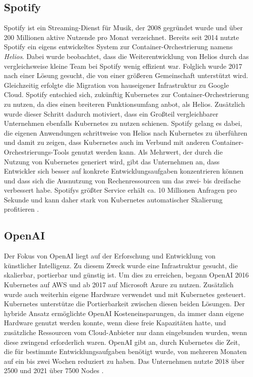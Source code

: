 \documentclass[11pt,a4paper]{article}
\begin{document}
\subsection{Spotify}
Spotify ist ein Streaming-Dienst für Musik, der 2008 gegründet wurde
und über 200 Millionen aktive Nutzende pro Monat verzeichnet.
Bereits seit 2014 nutzte Spotify ein eigens entwickeltes System zur Container-Orchestrierung
namens \emph{Helios}. Dabei wurde beobachtet, dass die Weiterentwicklung von Helios
durch das vergleichsweise kleine Team bei Spotify wenig effizient war.
Folglich wurde 2017 nach einer Lösung gesucht, die von einer größeren Gemeinschaft
unterstützt wird. Gleichzeitig erfolgte die Migration von hauseigener Infrastruktur
zu Google Cloud. Spotify entschied sich, zukünftig Kubernetes zur Container-Orchestrierung zu nutzen,
da dies einen breiteren Funktionsumfang anbot, als Helios.
Zusätzlich wurde dieser Schritt dadurch motiviert, dass ein Großteil
vergleichbarer Unternehmen ebenfalls Kubernetes zu nutzen schienen.
Spotify gelang es dabei, die eigenen Anwendungen schrittweise
von Helios nach Kubernetes zu überführen und damit zu zeigen, dass Kubernetes
auch im Verbund mit anderen Container-Orchestrierungs-Tools genutzt werden kann.
Als Mehrwert, der durch die Nutzung von Kubernetes generiert wird,
gibt das Unternehmen an, dass Entwickler sich besser auf konkrete Entwicklungsaufgaben
konzentrieren können und dass sich die Ausnutzung von Rechenressourcen
um das zwei- bis dreifache verbessert habe.
Spotifys größter Service erhält ca. 10 Millionen Anfragen pro Sekunde
und kann daher stark von Kubernetes automatischer Skalierung profitieren \cite{story_spotify}.

\subsection{OpenAI}
\label{sec:openai}
Der Fokus von OpenAI liegt auf der Erforschung und Entwicklung von künstlicher Intelligenz.
Zu diesem Zweck wurde eine Infrastruktur gesucht, die skalierbar, portierbar und günstig ist.
Um dies zu erreichen, begann \mbox{OpenAI} 2016 Kubernetes auf AWS und ab 2017 auf
Microsoft Azure zu nutzen. Zusätzlich wurde auch weiterhin eigene Hardware verwendet
und mit Kubernetes gesteuert.
Kubernetes unterstütze die Portierbarkeit zwischen diesen beiden Lösungen.
Der hybride Ansatz ermöglichte OpenAI Kosteneinsparungen,
da immer dann eigene Hardware genutzt werden konnte, wenn diese freie Kapazitäten hatte,
und zusätzliche Ressourcen vom Cloud-Anbieter nur dann eingebunden wurden,
wenn diese zwingend erforderlich waren.
OpenAI gibt an, durch Kubernetes die Zeit, die für bestimmte Entwicklungsaufgaben
benötigt wurde, von mehreren Monaten auf ein bis zwei Wochen reduziert zu haben.
Das Unternehmen nutzte 2018 über 2500 \cite{openai_scaling_2500} und 2021 über 7500 Nodes \cite{openai_scaling_7500} \cite{story_openai}.
\end{document}
